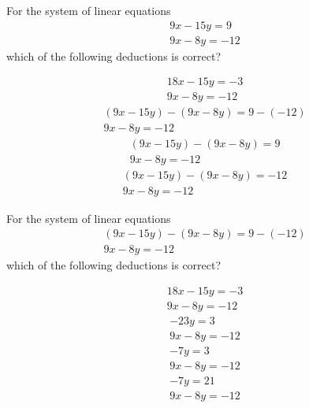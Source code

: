 \documentclass{webquiz}
\begin{document}
\begin{question} %
For the system of linear equations
\begin{gather*} 
9x-15y=9\\
9x-8y=-12
\end{gather*}
which of the following deductions is correct?
\begin{choice}[columns=1] %
\incorrect
\begin{gather*} 
18x-15y=-3\\
9x-8y=-12
\end{gather*}
\correct
\begin{gather*} 
(9x-15y)-(9x-8y)=9-(-12)\\
9x-8y=-12
\end{gather*}
\incorrect
\begin{gather*} 
(9x-15y)-(9x-8y)=9\\
9x-8y=-12
\end{gather*}
\incorrect
\begin{gather*} 
(9x-15y)-(9x-8y)=-12\\
9x-8y=-12
\end{gather*}
\end{choice}
\end{question}


\begin{question} %
For the system of linear equations
\begin{gather*} 
(9x-15y)-(9x-8y)=9-(-12)\\
9x-8y=-12
\end{gather*}
which of the following deductions is correct?
\begin{choice}[columns=1] %
\incorrect
\begin{gather*} 
18x-15y=-3\\
9x-8y=-12
\end{gather*}
\incorrect
\begin{gather*} 
-23y=3\\
9x-8y=-12
\end{gather*}
\incorrect
\begin{gather*} 
-7y=3\\
9x-8y=-12
\end{gather*}
\correct
\begin{gather*} 
-7y=21\\
9x-8y=-12
\end{gather*}
\end{choice}
\end{question}
\end{document}
